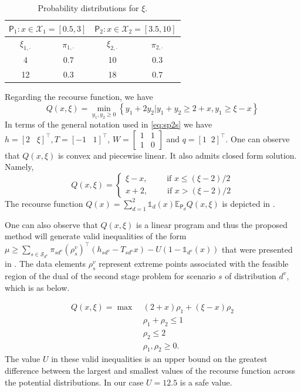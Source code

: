 \documentclass[12pt]{article}
\theoremstyle{thmstylethree}%
\newcommand{\mtc}[1] {\mathcal{#1}}
\newcommand{\pr}[1]{\ensuremath{\mathsf{#1}}}
\def\Ex{\ensuremath{\mathbb{E}}}
\def\Ind{\ensuremath{\mathbb{1}}}
\begin{document}
\begin{table}[htp]
\caption{Probability distributions for $\xi$.}
\label{tbl:xi_dists}

\centering
\begin{tabular}{cc|cc}
\toprule
\multicolumn{2}{c}{$\pr{P}_1: x \in \mtc{X}_1= [0.5,3]$} & \multicolumn{2}{c}{$\pr{P}_2: x \in \mtc{X}_2= [3.5,10]$}\\
\midrule
$\xi_{1,\cdot}$ & $\pi_{1,\cdot}$ & $\xi_{2,\cdot}$ & $\pi_{2,\cdot}$ \\
\hline
4 & 0.7 & 10 & 0.3 \\ 
12 & 0.3 & 18 & 0.7 \\
\bottomrule
\end{tabular}
\end{table}


Regarding the recourse function, we have
  $$Q(x,\xi)=\min_{y_1,y_2\geq 0} \left\{ y_1+2y_2 \vert y_1+y_2\geq 2+x, y_1\geq \xi-x\right\}$$
In terms of the general notation used in \eqref{eq:sp2s} we have $h = [2 \;\;\; \xi]^\top, T = [-1 \;\;\; 1]^\top$, $W= \begin{bmatrix}
1 & 1 \\
1 & 0 
\end{bmatrix}$ and $q=[1 \;\; 2]^\top$.
One can observe that $Q(x,\xi)$ is convex and piecewise linear. It also admits closed form solution. Namely, 
  $$
  Q(x,\xi)=
  \begin{cases}
    \xi-x,\qquad \text{~if~}x\leq (\xi-2)/2\\
    x+2, \qquad \text{~if~} x> (\xi-2)/2
  \end{cases}
  $$ 
The recourse function $Q(x)=\sum_{d=1}^2\Ind_d(x)\Ex_{\pr{P}_d}Q(x,\xi)$ is depicted in . 

One can also observe that $Q(x,\xi)$ is a linear program and thus the proposed method will generate valid inequalities of the form $\mu\geq \sum_{s\in\mtc{S}_{d^v}}\pi_{sd^v}(\rho^v_s)^\top(h_{sd^v}-T_{sd^v}x) - U(1-\Ind_{d^v}(x))$ that were presented in .  The data elements $\rho_{s}^{v}$ represent extreme points associated with the feasible region of the dual of the second stage problem for scenario $s$ of distribution $d^{v}$, which is as below. 

\begin{align*}
Q(x,\xi) =  \max~&  (2 + x) \rho_{1} + (\xi - x) \rho_{2} \\
  &\rho_1  +  \rho_2 \leq 1 \\
 & \rho_2 \leq 2 \\
 &\rho_1,  \rho_2 \geq 0.
\end{align*}
The value $U$ in these valid inequalities is an upper bound on the greatest difference between the largest and smallest values of the recourse function across the potential distributions. In our case $U=12.5$ is a safe value.
\end{document}
